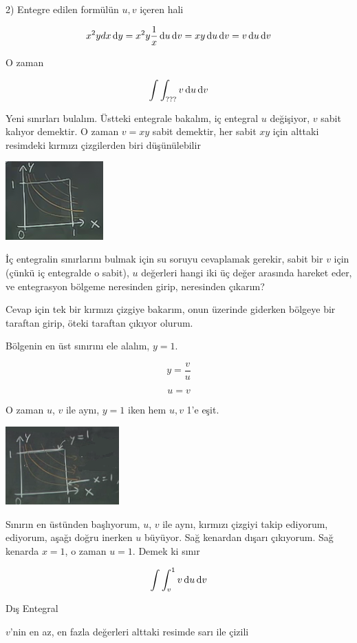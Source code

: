 \documentclass[12pt,fleqn]{article}\usepackage{../../common}
\begin{document}
2) Entegre edilen formülün $u,v$ içeren hali 

$$ x^2y dx \,\mathrm{d} y =  x^2y  \frac{1}{x} \,\mathrm{d} u \,\mathrm{d} v = 
xy \,\mathrm{d} u \,\mathrm{d} v = 
v  \,\mathrm{d} u \,\mathrm{d} v 
$$

O zaman 

$$ \int \int _{???} v \,\mathrm{d} u \,\mathrm{d} v $$

Yeni sınırları bulalım. Üstteki entegrale bakalım, iç entegral $u$
değişiyor, $v$ sabit kalıyor demektir. O zaman $v=xy$ sabit demektir, her
sabit $xy$ için alttaki resimdeki kırmızı çizgilerden biri düşünülebilir

\includegraphics[height=3cm]{18_6.png}

İç entegralin sınırlarını bulmak için su soruyu cevaplamak gerekir, sabit bir
$v$ için (çünkü iç entegralde o sabit), $u$ değerleri hangi iki üç değer
arasında hareket eder, ve entegrasyon bölgeme neresinden girip, neresinden
çıkarım?

Cevap için tek bir kırmızı çizgiye bakarım, onun üzerinde giderken bölgeye
bir taraftan girip, öteki taraftan çıkıyor olurum. 

Bölgenin en üst sınırını ele alalım, $y=1$. 

$$ y = \frac{v}{u}  $$

$$ u = v $$

O zaman $u$, $v$ ile aynı, $y=1$ iken hem $u,v$ 1'e eşit.

\includegraphics[height=3cm]{18_7.png}

Sınırın en üstünden başlıyorum, $u$, $v$ ile aynı, kırmızı çizgiyi takip
ediyorum, ediyorum, aşağı doğru inerken $u$ büyüyor. Sağ kenardan dışarı
çıkıyorum. Sağ kenarda $x=1$, o zaman $u = 1$. Demek ki sınır

$$ \int \int _v^1 v \,\mathrm{d} u \,\mathrm{d} v $$

Dış Entegral 

$v$'nin en az, en fazla değerleri alttaki resimde sarı ile çizili
\end{document}

